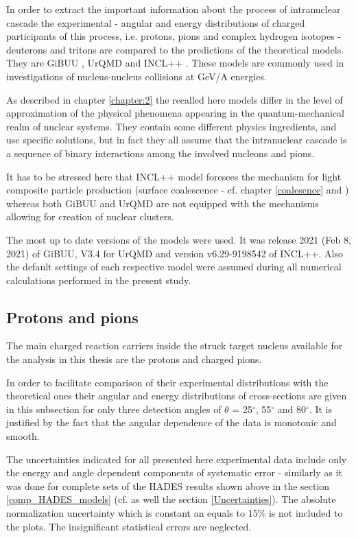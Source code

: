 In order to extract the important information
about the process of intranuclear cascade the experimental - angular and energy distributions of charged participants of this process, i.e. protons, pions and complex hydrogen isotopes - deuterons and tritons are compared to the
predictions of the theoretical models. 
They are GiBUU \cite{GiBUUBuss2012}, UrQMD
\cite{UrQMDBleicher1999} and INCL++ \cite{INCLMancusi2014}.
These models are commonly used in investigations
of nucleus-nucleus collisions at GeV/A energies.

As described in chapter \ref{chapter:2} 
the recalled here models differ in the level of approximation of the physical
phenomena appearing in the quantum-mechanical realm of nuclear systems.
They contain some different physics ingredients, and use specific solutions, but in fact they all assume that the intranuclear cascade is a  sequence of binary interactions among the involved nucleons and pions.   

It has to be stressed here that INCL++ model foresees the mechanism for light composite particle production (surface coalescence - cf. chapter \ref{coalesence} and \cite{INCLboudard2013new}) whereas 
both GiBUU and UrQMD are not equipped with the mechanisms allowing for creation of nuclear clusters.

The most up to date versions of the models were used. It was release 2021 (Feb 8, 2021) of GiBUU,
V3.4 for UrQMD and version v6.29-9198542 of INCL++. Also the default settings of each respective model were assumed during all numerical calculations performed in the present study.

\subsection{\label{p_and_pi} Protons and pions}

The main charged reaction carriers inside the struck target nucleus available for the analysis in this thesis are the protons and charged pions.

In order to facilitate comparison of their experimental distributions with the theoretical ones their angular and energy distributions of
cross-sections are given in this subsection 
for only three detection angles of $\theta$ = 25$^{\circ}$, 55$^{\circ}$ and 80$^{\circ}$.
It is justified by the fact that the angular dependence of the data is monotonic and smooth. 

The uncertainties indicated for all presented here experimental data 
include only the energy and angle dependent components of systematic
error - similarly as it was done for complete sets of the HADES results shown above in the section  \ref{comp_HADES_models} (cf. as well the section \ref{Uncertainties}). The absolute normalization uncertainty which is constant an equals to 15\% is not included to the plots. 
The insignificant statistical errors are neglected.

